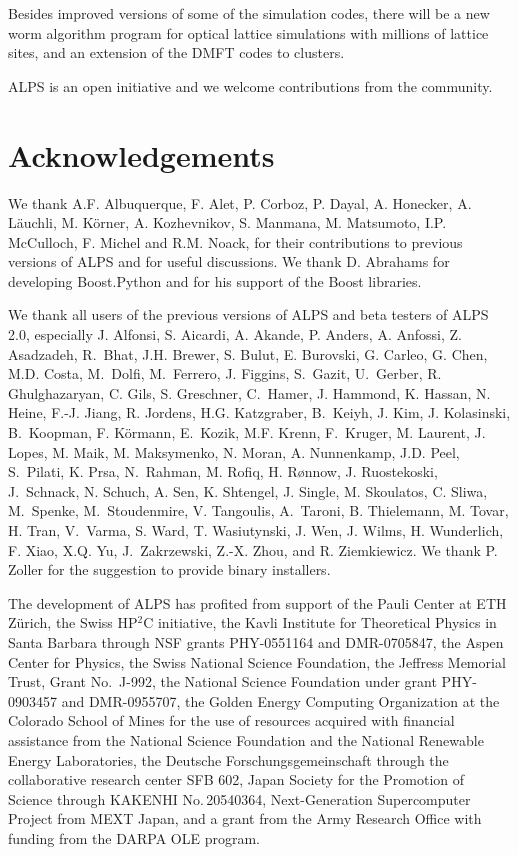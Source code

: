 \documentclass[12pt]{iopart}
\begin{document}
Besides improved versions of some of the simulation codes, there will be a new worm algorithm program for optical lattice simulations with millions of lattice sites, and an extension of the DMFT codes to clusters.

ALPS is an open initiative and we welcome contributions from the community.


\section{Acknowledgements}

We thank A.F. Albuquerque, F. Alet, P. Corboz, P. Dayal, A. Honecker, A. L\"auchli, M. K\"orner, A. Kozhevnikov, S. Manmana, M. Matsumoto, I.P. McCulloch, F. Michel and R.M. Noack, for their contributions to previous versions of ALPS and for useful discussions. We thank D. Abrahams for developing Boost.Python and for his support of the Boost libraries.

We thank all users of the previous versions of ALPS and beta testers of ALPS 2.0, especially J. Alfonsi, S. Aicardi, A. Akande, P. Anders, A. Anfossi, Z. Asadzadeh, R.~Bhat, J.H. Brewer, S. Bulut, E. Burovski, G. Carleo, G. Chen, M.D. Costa, M.~Dolfi, M.~Ferrero, J. Figgins, S.~Gazit, U.~Gerber, R. Ghulghazaryan, C. Gils, S. Greschner, C.~Hamer, J. Hammond, K. Hassan, N. Heine, F.-J. Jiang, R. Jordens, H.G. Katzgraber, B.~Keiyh, J. Kim, J. Kolasinski, B.~Koopman, F. K\"ormann, E.~Kozik, M.F. Krenn, F.~Kruger, M. Laurent, J. Lopes, M. Maik, M. Maksymenko, N. Moran, A. Nunnenkamp, J.D. Peel, S.~Pilati, K. Prsa, N.~Rahman, M. Rofiq, H. R\o nnow, J. Ruostekoski, J.~Schnack, N. Schuch, A. Sen, K. Shtengel, J. Single, M. Skoulatos, C. Sliwa, M.~Spenke, M.~Stoudenmire, V. Tangoulis, A.~Taroni, B. Thielemann, M. Tovar, H. Tran, V.~Varma, S. Ward, T. Wasiutynski, J. Wen, J. Wilms, H. Wunderlich, F. Xiao, X.Q. Yu, J.~Zakrzewski, Z.-X. Zhou, and R. Ziemkiewicz. We thank P. Zoller for the suggestion to provide binary installers. 

The development of ALPS has profited from support of the Pauli Center at ETH Z\"urich, the Swiss HP$^2$C initiative, the Kavli Institute for Theoretical Physics in Santa Barbara through NSF grants PHY-0551164 and DMR-0705847, the Aspen Center for Physics, the Swiss National Science Foundation, the Jeffress Memorial Trust, Grant No.~J-992, the National Science Foundation under grant PHY-0903457 and DMR-0955707, the Golden Energy Computing Organization at the Colorado
School of Mines for the use of resources acquired with financial assistance from the
National Science Foundation and the National Renewable Energy Laboratories, the Deutsche Forschungsgemeinschaft through the collaborative research center SFB 602, Japan Society for the Promotion of Science through KAKENHI No.\,20540364, Next-Generation Supercomputer Project from MEXT Japan, and a grant from the Army Research Office with funding from the DARPA OLE program.
\end{document}
